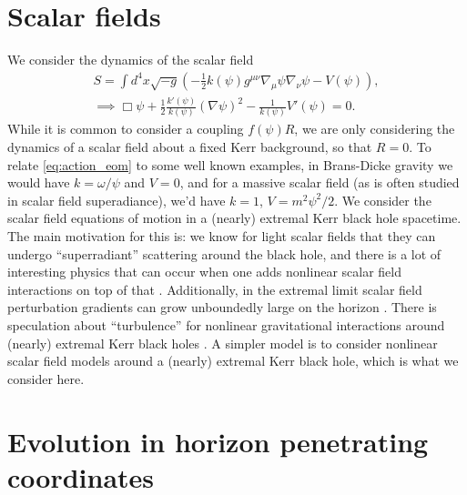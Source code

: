 \documentclass[%
 prd,
amsmath,amssymb,
preprint,%
]{revtex4-1}
\begin{document}
\section{\label{sec:scalar_fields}Scalar fields}
   We consider the dynamics of the scalar field
\begin{subequations}
\label{eq:action_eom}
\begin{align}
   \label{eq:action}
   S
   =
   \int d^4x\sqrt{-g}\left(
      -
      \frac{1}{2}k\left(\psi\right)g^{\mu\nu}\nabla_{\mu}\psi\nabla_{\nu}\psi
      -
      V\left(\psi\right)
   \right)
   ,\\
   \label{eq:eom}
   \implies
   \Box\psi
   +
   \frac{1}{2}\frac{k'\left(\psi\right)}{k\left(\psi\right)}
   \left(\nabla\psi\right)^2
   -
   \frac{1}{k\left(\psi\right)}V'\left(\psi\right)
   =
   0
   .
\end{align}
\end{subequations}
While it is common to consider a coupling $f\left(\psi\right)R$,
we are only considering the dynamics of a scalar field about
a fixed Kerr background, so that $R=0$.
To relate \eqref{eq:action_eom} to some well known examples, in
Brans-Dicke gravity we would have $k=\omega/\psi$ and $V=0$,
and for a massive scalar field (as is often studied in scalar
field superadiance), we'd have $k=1$, $V=m^2\psi^2/2$.
We consider the scalar field equations of motion in a (nearly)
extremal Kerr black hole spacetime.
The main motivation for this is: we know for light scalar fields
that they can undergo ``superradiant'' scattering around the black hole,
and there is a lot of interesting physics that can occur when
one adds nonlinear scalar field interactions on top of
that \cite{Baryakhtar:2020gao}.
Additionally, in the extremal limit scalar field perturbation gradients
can grow unboundedly large on the horizon \cite{Aretakis:2012ei}.
There is speculation about ``turbulence'' for nonlinear gravitational
interactions around (nearly) extremal Kerr black holes \cite{Yang:2014tla}.
A simpler model is to consider nonlinear scalar field models
around a (nearly) extremal Kerr black hole, which is what we consider here.
\section{\label{sec:coordinates}
   Evolution in horizon penetrating coordinates
   }
\end{document}
